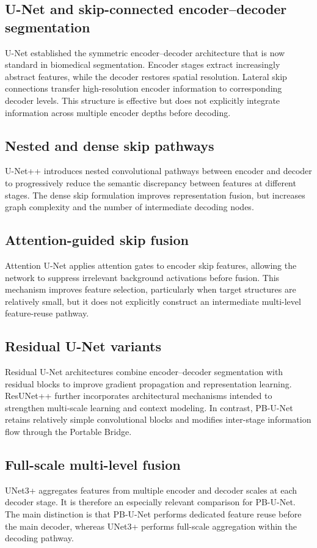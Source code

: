 \documentclass[11pt]{article}
\begin{document}
\subsection{U-Net and skip-connected encoder--decoder segmentation}
U-Net \citep{ronneberger2015unet} established the symmetric encoder--decoder architecture that is now standard in biomedical segmentation. Encoder stages extract increasingly abstract features, while the decoder restores spatial resolution. Lateral skip connections transfer high-resolution encoder information to corresponding decoder levels. This structure is effective but does not explicitly integrate information across multiple encoder depths before decoding.

\subsection{Nested and dense skip pathways}
U-Net++ \citep{zhou2018unetpp} introduces nested convolutional pathways between encoder and decoder to progressively reduce the semantic discrepancy between features at different stages. The dense skip formulation improves representation fusion, but increases graph complexity and the number of intermediate decoding nodes.

\subsection{Attention-guided skip fusion}
Attention U-Net \citep{oktay2018attention} applies attention gates to encoder skip features, allowing the network to suppress irrelevant background activations before fusion. This mechanism improves feature selection, particularly when target structures are relatively small, but it does not explicitly construct an intermediate multi-level feature-reuse pathway.

\subsection{Residual U-Net variants}
Residual U-Net architectures combine encoder--decoder segmentation with residual blocks to improve gradient propagation and representation learning. ResUNet++ further incorporates architectural mechanisms intended to strengthen multi-scale learning and context modeling. In contrast, PB-U-Net retains relatively simple convolutional blocks and modifies inter-stage information flow through the Portable Bridge.

\subsection{Full-scale multi-level fusion}
UNet3+ \citep{huang2020unet3plus} aggregates features from multiple encoder and decoder scales at each decoder stage. It is therefore an especially relevant comparison for PB-U-Net. The main distinction is that PB-U-Net performs dedicated feature reuse before the main decoder, whereas UNet3+ performs full-scale aggregation within the decoding pathway.
\end{document}
